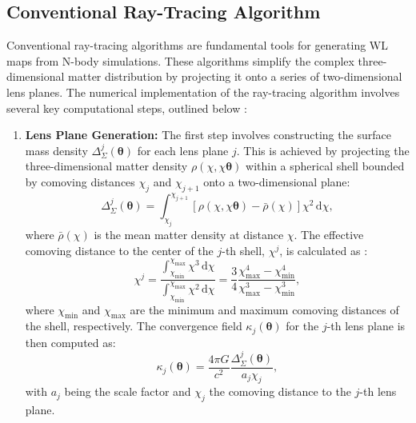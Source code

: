 \subsection{Conventional Ray-Tracing Algorithm}
\label{subsec:conventional-ray-tracing}
Conventional ray-tracing algorithms are fundamental tools for generating WL maps from N-body simulations. These algorithms simplify the complex three-dimensional matter distribution by projecting it onto a series of two-dimensional lens planes. The numerical implementation of the ray-tracing algorithm involves several key computational steps, outlined below \citep{2008ApJ...682....1D, 2009A&A...497..335T, 2015MNRAS.453.3043S}:

\begin{enumerate}
    \item \textbf{Lens Plane Generation:} 
    The first step involves constructing the surface mass density $\Delta_\Sigma^j(\boldsymbol{\theta})$ for each lens plane $j$. This is achieved by projecting the three-dimensional matter density $\rho(\chi, \chi\boldsymbol{\theta})$ within a spherical shell bounded by comoving distances $\chi_j$ and $\chi_{j+1}$ onto a two-dimensional plane:
    \begin{equation}
        \Delta_\Sigma^j(\boldsymbol{\theta}) = \int_{\chi_j}^{\chi_{j+1}} \left[ \rho(\chi, \chi\boldsymbol{\theta}) - \bar{\rho}(\chi) \right] \chi^2 \, \mathrm{d}\chi,
    \end{equation}
    where $\bar{\rho}(\chi)$ is the mean matter density at distance $\chi$. 
    The effective comoving distance to the center of the $j$-th shell, $\chi^j$, is calculated as \citep{2015MNRAS.453.3043S}:
    \begin{equation}
        \chi^j = \frac{\int_{\chi_{\min}}^{\chi_{\max}} \chi^3 \, \mathrm{d}\chi}{\int_{\chi_{\min}}^{\chi_{\max}} \chi^2 \, \mathrm{d}\chi} = \frac{3}{4} \frac{\chi_{\max}^4 - \chi_{\min}^4}{\chi_{\max}^3 - \chi_{\min}^3},
    \end{equation}
    where $\chi_{\min}$ and $\chi_{\max}$ are the minimum and maximum comoving distances of the shell, respectively.
    The convergence field $\kappa_j(\boldsymbol{\theta})$ for the $j$-th lens plane is then computed as:
    \begin{equation}
        \kappa_j(\boldsymbol{\theta}) = \frac{4\pi G}{c^2} \frac{\Delta_\Sigma^j(\boldsymbol{\theta})}{a_j \chi_j},
    \end{equation}
    with $a_j$ being the scale factor and $\chi_j$ the comoving distance to the $j$-th lens plane.


\end{enumerate}

